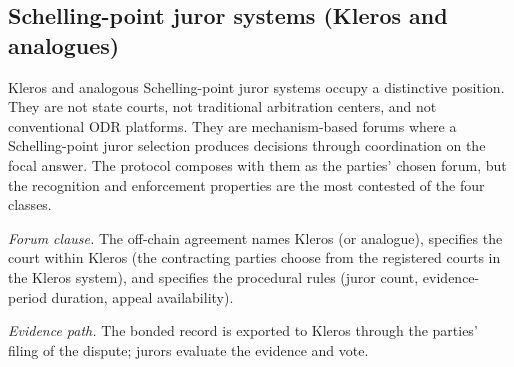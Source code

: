 \documentclass[11pt,a4paper]{article}
\theoremstyle{remark}
\begin{document}
\subsection{Schelling-point juror systems (Kleros and analogues)}

Kleros and analogous Schelling-point juror systems
\citep{kleros2019} occupy a distinctive position. They are not
state courts, not traditional arbitration centers, and not
conventional ODR platforms. They are mechanism-based forums
where a Schelling-point juror selection produces decisions
through coordination on the focal answer. The protocol composes
with them as the parties' chosen forum, but the recognition
and enforcement properties are the most contested of the four
classes.

\emph{Forum clause.} The off-chain agreement names Kleros (or
analogue), specifies the court within Kleros (the contracting
parties choose from the registered courts in the Kleros system),
and specifies the procedural rules (juror count, evidence-period
duration, appeal availability).

\emph{Evidence path.} The bonded record is exported to Kleros
through the parties' filing of the dispute; jurors evaluate the
evidence and vote.
\end{document}
